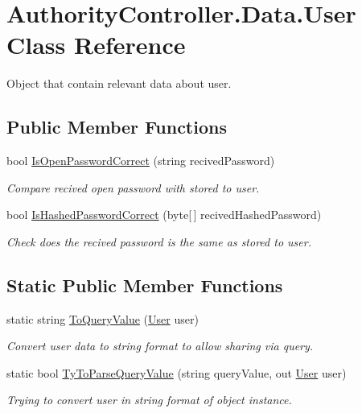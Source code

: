 \hypertarget{class_authority_controller_1_1_data_1_1_user}{}\section{Authority\+Controller.\+Data.\+User Class Reference}
\label{class_authority_controller_1_1_data_1_1_user}


Object that contain relevant data about user.  


\subsection*{Public Member Functions}
\begin{DoxyCompactItemize}
\item 
bool \mbox{\hyperlink{class_authority_controller_1_1_data_1_1_user_a654c513481e7cfbe36530c3cf6a908f7}{Is\+Open\+Password\+Correct}} (string recived\+Password)
\begin{DoxyCompactList}\small\item\em Compare recived open password with stored to user. \end{DoxyCompactList}\item 
bool \mbox{\hyperlink{class_authority_controller_1_1_data_1_1_user_ab34b934bfdb2603010dd4f25f118c3b4}{Is\+Hashed\+Password\+Correct}} (byte\mbox{[}$\,$\mbox{]} recived\+Hashed\+Password)
\begin{DoxyCompactList}\small\item\em Check does the recived password is the same as stored to user. \end{DoxyCompactList}\end{DoxyCompactItemize}
\subsection*{Static Public Member Functions}
\begin{DoxyCompactItemize}
\item 
static string \mbox{\hyperlink{class_authority_controller_1_1_data_1_1_user_a503a867ba5d2a9a3b1ca1eec4308325c}{To\+Query\+Value}} (\mbox{\hyperlink{class_authority_controller_1_1_data_1_1_user}{User}} user)
\begin{DoxyCompactList}\small\item\em Convert user data to string format to allow sharing via query. \end{DoxyCompactList}\item 
static bool \mbox{\hyperlink{class_authority_controller_1_1_data_1_1_user_adb8253e5d75b65467e42fcf243eeb991}{Ty\+To\+Parse\+Query\+Value}} (string query\+Value, out \mbox{\hyperlink{class_authority_controller_1_1_data_1_1_user}{User}} user)
\begin{DoxyCompactList}\small\item\em Trying to convert user in string format of object instance. \end{DoxyCompactList}\end{DoxyCompactItemize}
